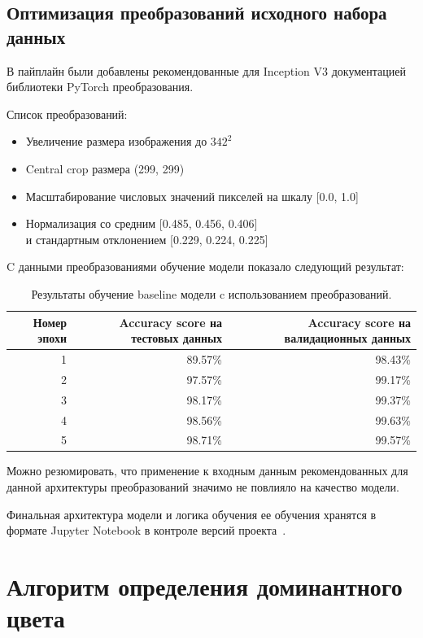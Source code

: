 \documentclass[a4paper,12pt]{extarticle}
\begin{document}
\subsection{Оптимизация преобразований исходного набора данных}

В пайплайн были добавлены рекомендованные для Inception V3 документацией библиотеки PyTorch
преобразования.\par

Список преобразований:

\begin{itemize}
	\item Увеличение размера изображения до $342^2$
	\item Central crop размера (299, 299)
	\item Масштабирование числовых значений пикселей на шкалу [0.0, 1.0]
	\item Нормализация со средним [0.485, 0.456, 0.406]\\
	и стандартным отклонением [0.229, 0.224, 0.225]
\end{itemize}

C данными преобразованиями обучение модели показало следующий результат:

\begin{table}[ht]
	\caption{Результаты обучение baseline модели c использованием преобразований.}
	\label{table:baseline_transformed_by_epoch}
	\footnotesize
	\centering
	\begin{tabular}{ |r|r|r| }
		\hline
		Номер эпохи & Accuracy score на тестовых данных & Accuracy score на валидационных данных \\ [0.5ex]
		\hline\hline
		1 & 89.57\% & 98.43\% \\
		\hline
		2 & 97.57\% & 99.17\% \\
		\hline
		3 & 98.17\% & 99.37\% \\
		\hline
		4 & 98.56\% & 99.63\% \\
		\hline
		5 & 98.71\% & 99.57\% \\
		\hline
	\end{tabular}
\end{table}

Можно резюмировать, что применение к входным данным рекомендованных для данной
архитектуры преобразований значимо не повлияло на качество модели.

Финальная архитектура модели и логика обучения ее обучения хранятся в формате Jupyter Notebook в
контроле версий проекта~\cite{model}.

\newpage
\section{Алгоритм определения доминантного цвета}
\end{document}
